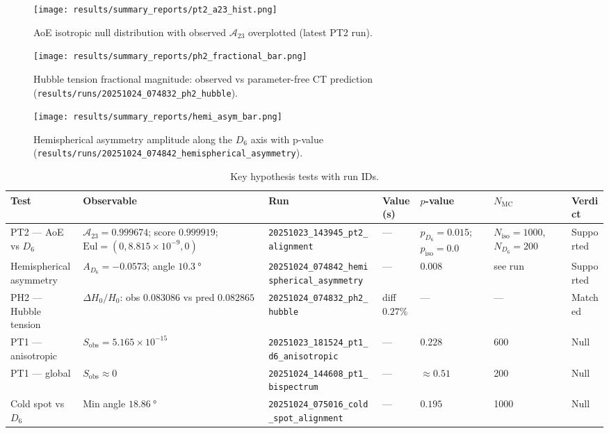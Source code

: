 \documentclass[reprint,aps,prl,twocolumn,nofootinbib,longbibliography]{revtex4-2}
\DeclareRobustCommand{\Eul}{\mathrm{Eul}}
\begin{document}
\begin{figure}[t]
  \centering
  \texttt{[image: results/summary\_reports/pt2\_a23\_hist.png]}
  \caption{AoE isotropic null distribution with observed $\mathcal{A}_{23}$ overplotted (latest PT2 run).}
  \label{fig:a23-hist}
\end{figure}

\begin{figure}[t]
  \centering
  \texttt{[image: results/summary\_reports/ph2\_fractional\_bar.png]}
  \caption{Hubble tension fractional magnitude: observed vs parameter-free CT prediction (\texttt{results/runs/20251024\_074832\_ph2\_hubble}).}
  \label{fig:ph2-bar}
\end{figure}

\begin{figure}[t]
  \centering
  \texttt{[image: results/summary\_reports/hemi\_asym\_bar.png]}
  \caption{Hemispherical asymmetry amplitude along the $D_6$ axis with p-value (\texttt{results/runs/20251024\_074842\_hemispherical\_asymmetry}).}
  \label{fig:hemi-bar}
\end{figure}

\begin{table*}[t]
\centering
\caption{Key hypothesis tests with run IDs.}
\label{tab:key-tests}
\setlength{\tabcolsep}{6pt}
\begin{tabular}{@{}lllllll@{}}
\toprule
Test & Observable & Run & Value(s) & $p$-value & $N_{\mathrm{MC}}$ & Verdict \\
\midrule
PT2 — AoE vs $D_6$ & $\mathcal{A}_{23}=0.999674$; score $0.999919$; $\Eul=(0,8.815\times10^{-9},0)$ & \texttt{20251023\_143945\_pt2\_alignment} & — & $p_{D_6}=0.015$; $p_{\mathrm{iso}}=0.0$ & $N_{\mathrm{iso}}{=}1000$, $N_{D_6}{=}200$ & Supported \\
Hemispherical asymmetry & $A_{D_6}=-0.0573$; angle $\SI{10.3}{\degree}$ & \texttt{20251024\_074842\_hemispherical\_asymmetry} & — & $0.008$ & see run & Supported \\
PH2 — Hubble tension & $\Delta H_0/H_0$: obs $0.083086$ vs pred $0.082865$ & \texttt{20251024\_074832\_ph2\_hubble} & diff $0.27\%$ & — & — & Matched \\
PT1 — anisotropic & $S_{\mathrm{obs}}=5.165\times10^{-15}$ & \texttt{20251023\_181524\_pt1\_d6\_anisotropic} & — & $0.228$ & 600 & Null \\
PT1 — global & $S_{\mathrm{obs}}\approx 0$ & \texttt{20251024\_144608\_pt1\_bispectrum} & — & $\approx 0.51$ & 200 & Null \\
Cold spot vs $D_6$ & Min angle $\SI{18.86}{\degree}$ & \texttt{20251024\_075016\_cold\_spot\_alignment} & — & $0.195$ & 1000 & Null \\
\bottomrule
\end{tabular}
\end{table*}
\end{document}
